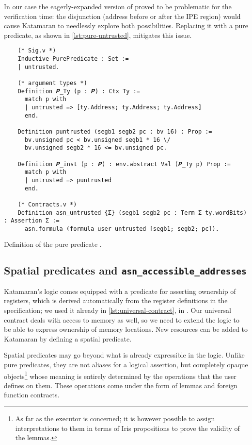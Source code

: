 In our case the eagerly-expanded version of  proved to be problematic for the verification time: the disjunction (address before or after the IPE region) would cause Katamaran to needlessly explore both possibilities. Replacing it with a pure predicate, as shown in \cref{lst:pure-untrusted}, mitigates this issue.

\begin{listing}[htb]
  \begin{verbatim}
    (* Sig.v *)
    Inductive PurePredicate : Set :=
    | untrusted.

    (* argument types *)
    Definition 𝑷_Ty (p : 𝑷) : Ctx Ty :=
      match p with
      | untrusted => [ty.Address; ty.Address; ty.Address]
      end.

    Definition puntrusted (segb1 segb2 pc : bv 16) : Prop :=
      bv.unsigned pc < bv.unsigned segb1 * 16 \/
      bv.unsigned segb2 * 16 <= bv.unsigned pc.

    Definition 𝑷_inst (p : 𝑷) : env.abstract Val (𝑷_Ty p) Prop :=
      match p with
      | untrusted => puntrusted
      end.

    (* Contracts.v *)
    Definition asn_untrusted {Σ} (segb1 segb2 pc : Term Σ ty.wordBits) : Assertion Σ :=
      asn.formula (formula_user untrusted [segb1; segb2; pc]).
  \end{verbatim}
  \caption{Definition of the pure predicate .}
  \label{lst:pure-untrusted}
\end{listing}

\subsection{Spatial predicates and \texttt{asn\_accessible\_addresses}}
\label{sec:spatial-preds}

Katamaran's logic comes equipped with a predicate for asserting ownership of registers, which is derived automatically from the register definitions in the \usail specification; we used it already in \cref{lst:universal-contract}, \eg in . Our universal contract deals with access to memory as well, so we need to extend the logic to be able to express ownership of memory locations. New resources can be added to Katamaran by defining a spatial predicate.

Spatial predicates may go beyond what is already expressible in the logic. Unlike pure predicates, they are not aliases for a logical assertion, but completely opaque objects\footnote{As far as the executor is concerned; it is however possible to assign interpretations to them in terms of Iris propositions to prove the validity of the lemmas.} whose meaning is entirely determined by the operations that the user defines on them. These operations come under the form of lemmas and foreign function contracts.


